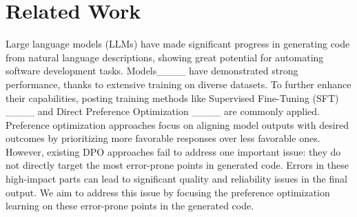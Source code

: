 \section{Related Work}
Large language models (LLMs) have made significant progress in generating code from natural language descriptions, showing great potential for automating software development tasks. Models____ have demonstrated strong performance, thanks to extensive training on diverse datasets. To further enhance their capabilities, posting training methods like Supervised Fine-Tuning (SFT) ____ and Direct Preference Optimization ____ are commonly applied. Preference optimization approaches focus on aligning model outputs with desired outcomes by prioritizing more favorable responses over less favorable ones. 
However, existing DPO approaches fail to address one important issue: they do not directly target the most error-prone points in generated code. Errors in these high-impact parts can lead to significant quality and reliability issues in the final output. 
We aim to address this issue by focusing the preference optimization learning on these error-prone points in the generated code. 


